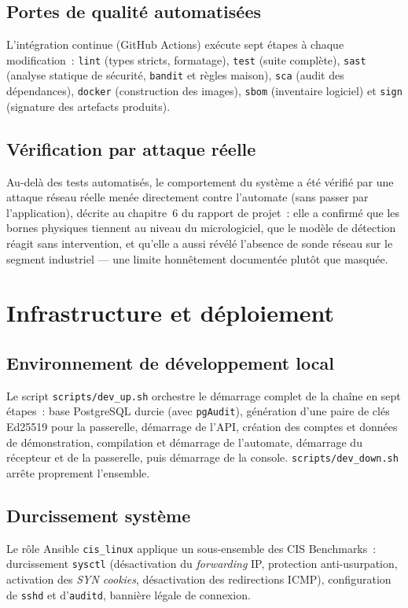 \documentclass[11pt,a4paper]{report}
\begin{document}
\section{Portes de qualité automatisées}
L'intégration continue (GitHub Actions) exécute sept étapes à chaque
modification~: \texttt{lint} (types stricts, formatage), \texttt{test}
(suite complète), \texttt{sast} (analyse statique de sécurité, \texttt{bandit}
et règles maison), \texttt{sca} (audit des dépendances), \texttt{docker}
(construction des images), \texttt{sbom} (inventaire logiciel) et
\texttt{sign} (signature des artefacts produits).

\section{Vérification par attaque réelle}
Au-delà des tests automatisés, le comportement du système a été vérifié par
une attaque réseau réelle menée directement contre l'automate (sans passer
par l'application), décrite au chapitre~6 du rapport de projet~: elle a
confirmé que les bornes physiques tiennent au niveau du micrologiciel, que le
modèle de détection réagit sans intervention, et qu'elle a aussi révélé
l'absence de sonde réseau sur le segment industriel --- une limite
honnêtement documentée plutôt que masquée.

\chapter{Infrastructure et déploiement}

\section{Environnement de développement local}
Le script \texttt{scripts/dev\_up.sh} orchestre le démarrage complet de la
chaîne en sept étapes~: base PostgreSQL durcie (avec \texttt{pgAudit}),
génération d'une paire de clés Ed25519 pour la passerelle, démarrage de
l'API, création des comptes et données de démonstration, compilation et
démarrage de l'automate, démarrage du récepteur et de la passerelle, puis
démarrage de la console. \texttt{scripts/dev\_down.sh} arrête proprement
l'ensemble.

\section{Durcissement système}
Le rôle Ansible \texttt{cis\_linux} applique un sous-ensemble des CIS
Benchmarks~: durcissement \texttt{sysctl} (désactivation du
\emph{forwarding} IP, protection anti-usurpation, activation des
\emph{SYN cookies}, désactivation des redirections ICMP), configuration de
\texttt{sshd} et d'\texttt{auditd}, bannière légale de connexion.
\end{document}
